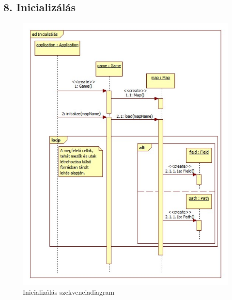 \subsection{8. Inicializálás}
\begin{figure}[H]
\begin{center}
\includegraphics[width=17cm]{chapters/chapter05/images/sd_Inicializalas.jpg}
\caption{Inicializálás szekvenciadiagram}
\label{fig:sd_Inicializalas}
\end{center}
\end{figure}

